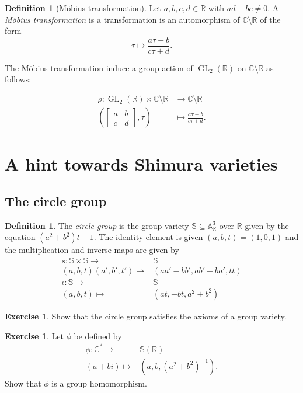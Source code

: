 \documentclass[a4paper,12pt,reqno]{amsart}
\newcommand{\field}[1]{\mathbb{#1}}  %
\newcommand{\R}{\field{R}} %
\newcommand{\C}{\field{C}} %
\newcommand{\A}{\field{A}}
\renewcommand{\SS}{\field{S}}
\DeclareMathOperator{\GL}{GL}
\theoremstyle{definition}
\newtheorem{definition}[lemma]{Definition}
\newtheorem{exercise}[lemma]{Exercise}
\numberwithin{lemma}{section}
\numberwithin{equation}{section}
\numberwithin{figure}{section}
\begin{document}
\begin{definition}[M\"obius transformation]\label{def:mobius-transformation}
Let $a,b,c,d \in \R$ with $ad-bc \neq 0$. A \textit{M\"obius transformation} is a transformation is an automorphism of $\C\setminus \R$ of the form
$$ \tau \mapsto \frac {a\tau+b} {c\tau +d}.$$

The M\"obius transformation induce a group action of $\GL_2(\R)$ on $\C\setminus \R$ as follows:

\begin{align*}
\rho :  \GL_2(\R) \times \C\setminus \R &\to \C\setminus \R \\
\left(\begin{bmatrix}
a & b \\ 
c & d
\end{bmatrix}  ,\tau\right) &\mapsto  \frac {a\tau+b} {c\tau +d}.
\end{align*}
\end{definition}



\section{A hint towards Shimura varieties}

\subsection{The circle group}

\begin{definition}
	The \textit{circle group} is the group variety $\SS \subseteq \A^3_\R$ over $\R$ given by the equation $(a^2+b^2)t-1$. The identity element is given $(a,b,t)=(1,0,1)$ and the multiplication and inverse maps are given by
	\begin{align*}
	 s : \SS \times \SS \to& \SS \\
	   (a,b,t)(a',b',t') \mapsto& (aa'-bb',ab'+ba', tt) \\
	 \iota : \SS \to & \SS\\
	           (a,b,t) \mapsto& (at,-bt,a^2+b^2)
	\end{align*} 
\end{definition}

\begin{exercise}
	Show that the circle group satisfies the axioms of a group variety.
\end{exercise}
\begin{exercise}
Let $\phi$ be defined by 
\begin{align*}
  \phi:\C^* \to& \SS(\R) \\
         (a+bi) \mapsto& (a,b,(a^2+b^2)^{-1}).
\end{align*}
Show that $\phi$ is a group homomorphism.
\end{exercise}



{}
\end{document}

